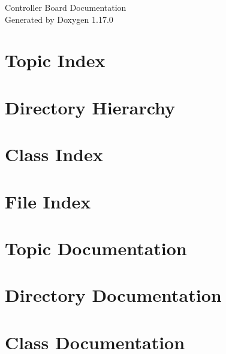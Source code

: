 \documentclass[twoside]{book}
\newcommand{\+}{\discretionary{\mbox{\scriptsize$\hookleftarrow$}}{}{}}
\newcommand{\clearemptydoublepage}{%
    \newpage{\pagestyle{empty}\cleardoublepage}%
  }
\begin{document}
  \raggedbottom
    \hypersetup{pageanchor=false,
                bookmarksnumbered=true,
                pdfencoding=unicode
               }
  \begin{titlepage}
  \vspace*{7cm}
  \begin{center}%
  {\Large Controller Board Documentation}\\
  \vspace*{1cm}
  {\large Generated by Doxygen 1.17.0}\\
  \end{center}
  \end{titlepage}
  \clearemptydoublepage
  \tableofcontents
  \clearemptydoublepage
  \hypersetup{pageanchor=true}

\chapter{Topic Index}

\chapter{Directory Hierarchy}

\chapter{Class Index}

\chapter{File Index}

\chapter{Topic Documentation}

\chapter{Directory Documentation}





\chapter{Class Documentation}



\end{document}
